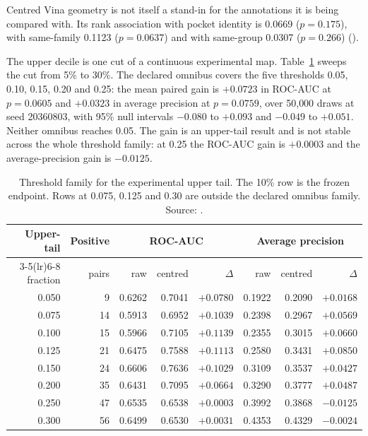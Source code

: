 Centred Vina geometry is not itself a stand-in for the annotations it is being compared with. Its
rank association with pocket identity is 0.0669 ($p=0.175$), with same-family 0.1123 ($p=0.0637$)
and with same-group 0.0307 ($p=0.266$)
().


The upper decile is one cut of a continuous experimental map. Table~\ref{tab:s6-threshold} sweeps
the cut from 5\% to 30\%. The declared omnibus covers the five thresholds 0.05, 0.10, 0.15, 0.20
and 0.25: the mean paired gain is $+0.0723$ in ROC-AUC at $p=0.0605$ and $+0.0323$ in average
precision at $p=0.0759$, over 50{,}000 draws at seed 20360803, with 95\% null intervals $-0.080$
to $+0.093$ and $-0.049$ to $+0.051$. Neither omnibus reaches 0.05. The gain is an upper-tail
result and is not stable across the whole threshold family: at 0.25 the ROC-AUC gain is $+0.0003$
and the average-precision gain is $-0.0125$.

\begin{table}[htbp]
\centering
\small
\setlength{\tabcolsep}{4pt}
\caption[Threshold family for the experimental upper tail]{Threshold family for the experimental upper tail. The 10\% row is the frozen endpoint.
Rows at 0.075, 0.125 and 0.30 are outside the declared omnibus family. Source:
.}
\label{tab:s6-threshold}
\begin{tabular}{rrrrrrrr}
\toprule
Upper-tail & Positive & \multicolumn{3}{c}{ROC-AUC} & \multicolumn{3}{c}{Average precision} \\
\cmidrule(lr){3-5}\cmidrule(lr){6-8}
fraction & pairs & raw & centred & $\Delta$ & raw & centred & $\Delta$ \\
\midrule
0.050 &  9 & 0.6262 & 0.7041 & $+0.0780$ & 0.1922 & 0.2090 & $+0.0168$ \\
0.075 & 14 & 0.5913 & 0.6952 & $+0.1039$ & 0.2398 & 0.2967 & $+0.0569$ \\
0.100 & 15 & 0.5966 & 0.7105 & $+0.1139$ & 0.2355 & 0.3015 & $+0.0660$ \\
0.125 & 21 & 0.6475 & 0.7588 & $+0.1113$ & 0.2580 & 0.3431 & $+0.0850$ \\
0.150 & 24 & 0.6606 & 0.7636 & $+0.1029$ & 0.3109 & 0.3537 & $+0.0427$ \\
0.200 & 35 & 0.6431 & 0.7095 & $+0.0664$ & 0.3290 & 0.3777 & $+0.0487$ \\
0.250 & 47 & 0.6535 & 0.6538 & $+0.0003$ & 0.3992 & 0.3868 & $-0.0125$ \\
0.300 & 56 & 0.6499 & 0.6530 & $+0.0031$ & 0.4353 & 0.4329 & $-0.0024$ \\
\bottomrule
\end{tabular}
\end{table}

